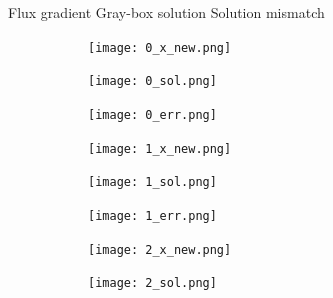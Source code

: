 \documentclass{paper1}
\begin{document}
\begin{figure}
    \centering
    Flux gradient\hspace{2cm} Gray-box solution \hspace{2cm} Solution mismatch
    \begin{subfigure}[b]{.95\textwidth}
          \centering
          \begin{subfigure}[b]{0.32\textwidth}
                  \centering
                  \texttt{[image: 0\_x\_new.png]}
          \end{subfigure}%
          \begin{subfigure}[b]{0.32\textwidth}
                  \centering
                  \texttt{[image: 0\_sol.png]}
          \end{subfigure}
          \begin{subfigure}[b]{0.32\textwidth}
                  \centering
                  \texttt{[image: 0\_err.png]}
          \end{subfigure}%
    \end{subfigure}
    \begin{subfigure}[b]{.95\textwidth}
          \centering
          \begin{subfigure}[b]{0.32\textwidth}
                  \centering
                  \texttt{[image: 1\_x\_new.png]}
          \end{subfigure}%
          \begin{subfigure}[b]{0.32\textwidth}
                  \centering
                  \texttt{[image: 1\_sol.png]}
          \end{subfigure}
          \begin{subfigure}[b]{0.32\textwidth}
                  \centering
                  \texttt{[image: 1\_err.png]}
          \end{subfigure}
    \end{subfigure}
    \begin{subfigure}[b]{.95\textwidth}
          \centering
          \begin{subfigure}[b]{0.32\textwidth}
                  \centering
                  \texttt{[image: 2\_x\_new.png]}
          \end{subfigure}%
          \begin{subfigure}[b]{0.32\textwidth}
                  \centering
                  \texttt{[image: 2\_sol.png]}
          \end{subfigure}
          \begin{subfigure}[b]{0.32\textwidth}
                  \centering

\end{subfigure}
\end{subfigure}
\end{figure}
\end{document}
